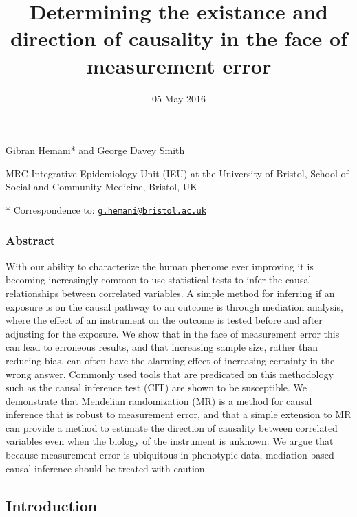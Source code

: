 \documentclass[]{article}
\title{Determining the existance and direction of causality in the face of
measurement error}
\author{}
\date{05 May 2016}
\begin{document}
\maketitle


Gibran Hemani* and George Davey Smith

MRC Integrative Epidemiology Unit (IEU) at the University of Bristol,
School of Social and Community Medicine, Bristol, UK

* Correspondence to:
\href{mailto:g.hemani@bristol.ac.uk}{\nolinkurl{g.hemani@bristol.ac.uk}}

\subsubsection{Abstract}\label{abstract}

With our ability to characterize the human phenome ever improving it is
becoming increasingly common to use statistical tests to infer the
causal relationships between correlated variables. A simple method for
inferring if an exposure is on the causal pathway to an outcome is
through mediation analysis, where the effect of an instrument on the
outcome is tested before and after adjusting for the exposure. We show
that in the face of measurement error this can lead to erroneous
results, and that increasing sample size, rather than reducing bias, can
often have the alarming effect of increasing certainty in the wrong
answer. Commonly used tools that are predicated on this methodology such
as the causal inference test (CIT) are shown to be susceptible. We
demonstrate that Mendelian randomization (MR) is a method for causal
inference that is robust to measurement error, and that a simple
extension to MR can provide a method to estimate the direction of
causality between correlated variables even when the biology of the
instrument is unknown. We argue that because measurement error is
ubiquitous in phenotypic data, mediation-based causal inference should
be treated with caution.

\subsection{Introduction}\label{introduction}
\end{document}
